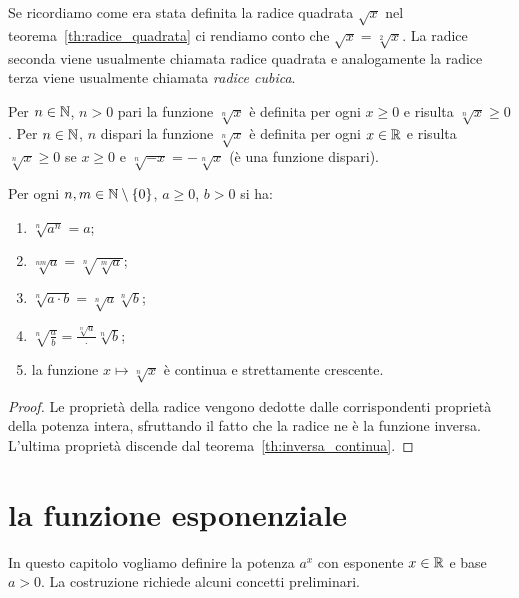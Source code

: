 Se ricordiamo come era stata definita la radice quadrata $\sqrt x$ nel
teorema~\ref{th:radice_quadrata} ci rendiamo conto che
$\sqrt {x} = \sqrt[2]{x}$.
La radice seconda viene usualmente chiamata radice quadrata e
analogamente la radice terza viene usualmente chiamata \emph{radice cubica}.

\begin{theorem}
Per $n\in \mathbb N$, $n>0$ pari la funzione $\sqrt[n]{x}$
è definita per ogni $x\ge 0$ e risulta $\sqrt[n]{x}\ge 0$.
Per $n\in \mathbb N$, $n$ dispari la funzione $\sqrt[n]{x}$
è definita per ogni $x\in \mathbb R$ e risulta $\sqrt[n]{x}\ge 0$
se $x\ge 0$ e $\sqrt[n]{-x} =-\sqrt[n]{x}$
(è una funzione dispari).


Per ogni $n,m \in \mathbb N\setminus{\left\{ 0 \right\}}$, $a\ge 0$, $b>0$ si ha:
\begin{enumerate}
\item $\sqrt[n]{a^n} = a$;
\item $\displaystyle \sqrt[nm]{a} = \sqrt[n]{\sqrt[m]{a}}$;
\item $\displaystyle \sqrt[n]{a\cdot b} = \sqrt[n]{a}\sqrt[n]{b}$;
\item $\displaystyle \sqrt[n]{\frac a b} = \frac{\sqrt[n]{a}}\cdot {\sqrt[n]{b}}$;
\item la funzione $x\mapsto \sqrt[n]{x}$ è continua e strettamente crescente.
\end{enumerate}
\end{theorem}

\begin{proof}
Le proprietà della radice vengono dedotte dalle corrispondenti proprietà
della potenza intera, sfruttando il fatto che la radice
ne è la funzione inversa.
L'ultima proprietà discende dal teorema~\ref{th:inversa_continua}.
\end{proof}

\section{la funzione esponenziale}

In questo capitolo vogliamo definire la potenza $a^x$
con esponente $x\in \mathbb R$ e base $a>0$.
La costruzione richiede alcuni concetti preliminari.

